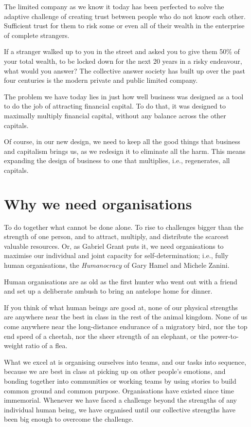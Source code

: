 The limited company as we know it today has been perfected to solve the adaptive challenge of creating trust between people who do not know each other. Sufficient trust for them to risk some or even all of their wealth in the enterprise of complete strangers. 


If a stranger walked up to you in the street and asked you to give them 50\% of your total wealth, to be locked down for the next 20 years in a risky endeavour, what would you answer? The collective answer society has built up over the past four centuries is the modern private and public limited company.


The problem we have today lies in just how well business was designed as a tool to do the job of attracting financial capital. To do that, it was designed to maximally multiply financial capital, without any balance across the other capitals. 


Of course, in our new design, we need to keep all the good things that business and capitalism brings us, as we redesign it to eliminate all the harm. This means expanding the design of business to one that multiplies, i.e., regenerates, all capitals.






\section{Why we need organisations}
To do together what cannot be done alone. To rise to challenges bigger than the strength of one person, and to attract, multiply, and distribute the scarcest valuable resources. Or, as Gabriel Grant puts it\cite{grant-determination}, we need organisations to maximise our individual and joint capacity for self-determination; i.e., fully human organisations, the  \emph{Humanocracy}\cite{hamel-humanocracy} of Gary Hamel and Michele Zanini.


Human organisations are as old as the first hunter who went out with a friend and set up a deliberate ambush to bring an antelope home for dinner. 


If you think of what human beings are good at, none of our physical strengths are anywhere near the best in class in the rest of the animal kingdom. None of us come anywhere near the long-distance endurance of a migratory bird, nor the top end speed of a cheetah, nor the sheer strength of an elephant, or the power-to-weight ratio of a flea.


What we excel at is organising ourselves into teams, and our tasks into sequence, because we are best in class at picking up on other people's emotions, and bonding together into communities or working teams by using stories to build common ground and common purpose. Organisations have existed since time immemorial. Whenever we have faced a challenge beyond the strengths of any individual human being, we have organised until our collective strengths have been big enough to overcome the challenge. 


